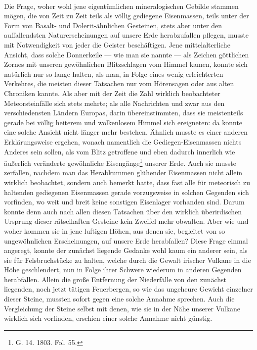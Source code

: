 \documentclass[a4paper, 8pt, oneside, polutonikogreek, german]{article}
\begin{document}
\paragraph{}
Die Frage, woher wohl jene eigentümlichen mineralogischen Gebilde stammen mögen, die von Zeit zu Zeit teils als völlig gediegene Eisenmassen, teils unter der Form von Basalt- und Dolerit-ähnlichen Gesteinen, stets aber unter den auffallendsten Naturerscheinungen auf unsere Erde herabzufallen pflegen, musste mit Notwendigkeit von jeder die Geister beschäftigen. Jene mittelalterliche Ansicht, dass solche Donnerkeile — wie man sie nannte — als Zeichen göttlichen Zornes mit unseren gewöhnlichen Blitzschlagen vom Himmel kamen, konnte sich natürlich nur so lange halten, als man, in Folge eines wenig erleichterten Verkehres, die meisten dieser Tatsachen nur vom Hörensagen oder aus alten Chroniken kannte. Als aber mit der Zeit die Zahl wirklich beobachteter Meteorsteinfälle sich stets mehrte; als alle Nachrichten und zwar aus den verschiedensten Ländern Europas, darin übereinstimmten, dass sie meistenteils gerade bei völlig heiterem und wolkenlosem Himmel sich ereigneten: da konnte eine solche Ansicht nicht länger mehr bestehen. Ähnlich musste es einer anderen Erklärungsweise ergehen, wonach namentlich die Gediegen-Eisenmassen nichts Anderes sein sollen, als vom Blitz getroffene und eben dadurch innerlich wie äußerlich veränderte gewöhnliche Eisengänge\footnote{G. 14. 1803. Fol. 55.} unserer Erde. Auch sie musste zerfallen, nachdem man das Herabkummen glühender Eisenmassen nicht allein wirklich beobachtet, sondern auch bemerkt hatte, dass fast alle für meteorisch zu haltenden gediegenen Eisenmassen gerade vorzugsweise in solchen Gegenden sich vorfinden, wo weit und breit keine sonstigen Eisenlager vorhanden sind. Darum konnte denn auch nach allen diesen Tatsachen über den wirklich überirdischen Ursprung dieser rätselhaften Gesteine kein Zweifel mehr obwalten. Aber wie und woher kommen sie in jene luftigen Höhen, aus denen sie, begleitet von so ungewöhnlichen Erscheinungen, auf unsere Erde herabfallen? Diese Frage einmal angeregt, konnte der zunächst liegende Gedanke wohl kaum ein anderer sein, als sie für Felsbruchstücke zu halten, welche durch die Gewalt irischer Vulkane in die Höhe geschlendert, nun in Folge ihrer Schwere wiederum in anderen Gegenden herabfallen. Allein die große Entfernung der Niederfälle von den zunächst liegenden, noch jetzt tätigen Feuerbergen, so wie das ungeheure Gewicht einzelner dieser Steine, mussten sofort gegen eine solche Annahme sprechen. Auch die Vergleichung der Steine selbst mit denen, wie sie in der Nähe unserer Vulkane wirklich sich vorfinden, erschien einer solche Annahme nicht günstig.
\end{document}
